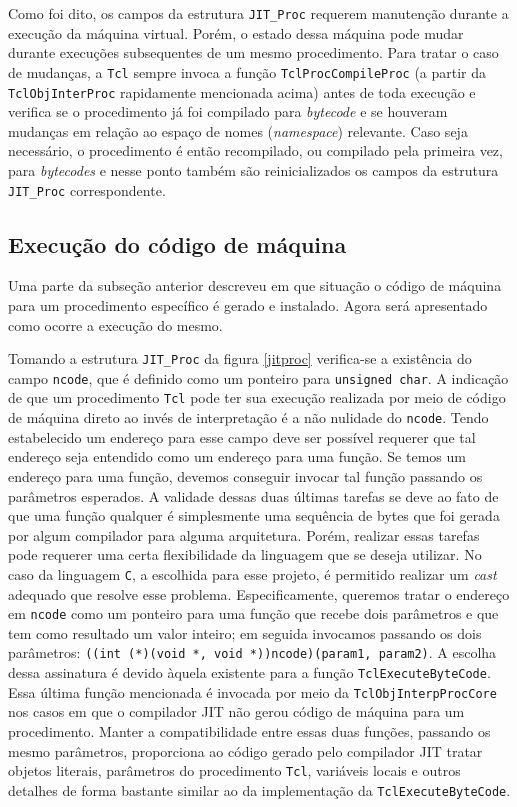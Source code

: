 Como foi dito, os campos da estrutura \verb!JIT_Proc! requerem
manutenção durante a execução da máquina virtual. Porém, o estado dessa
máquina pode mudar durante execuções subsequentes de um mesmo
procedimento. Para tratar o caso de mudanças, a \texttt{Tcl} sempre invoca a
função \verb!TclProcCompileProc! (a partir da \verb!TclObjInterProc!
rapidamente mencionada acima) antes de toda execução e verifica se o
procedimento já foi compilado para \textit{bytecode} e se houveram
mudanças em relação ao espaço de nomes (\textit{namespace})
relevante. Caso seja necessário, o procedimento é então recompilado,
ou compilado pela primeira vez, para \textit{bytecodes} e nesse ponto
também são reinicializados os campos da estrutura \verb!JIT_Proc!
correspondente.


\subsection{Execução do código de máquina}
\label{codeexec}
Uma parte da subseção anterior descreveu em que situação o código de
máquina para um procedimento específico é gerado e instalado. Agora será
apresentado como ocorre a execução do mesmo.

Tomando a estrutura \verb!JIT_Proc! da figura \ref{jitproc}
verifica-se a existência do campo \verb!ncode!, que é definido como
um ponteiro para \verb!unsigned char!. A indicação de que um
procedimento \texttt{Tcl} pode ter sua execução realizada por meio de
código de máquina direto ao invés de interpretação é a não nulidade do
\verb!ncode!. Tendo estabelecido um endereço para esse campo deve ser
possível requerer que tal endereço seja entendido como um endereço para
uma função. Se temos um endereço para uma função, devemos conseguir
invocar tal função passando os parâmetros esperados. A validade dessas
duas últimas tarefas se deve ao fato de que uma função qualquer é
simplesmente uma sequência de bytes que foi gerada por algum
compilador para alguma arquitetura. Porém, realizar essas tarefas pode
requerer uma certa flexibilidade da linguagem que se deseja
utilizar. No caso da linguagem \texttt{C}, a escolhida para
esse projeto, é permitido realizar um \textit{cast} adequado que
resolve esse problema. Especificamente, queremos tratar o endereço em
\verb!ncode! como um ponteiro para uma função que recebe dois
parâmetros e que tem como resultado um valor inteiro;
em seguida invocamos passando os dois parâmetros:
\verb!((int (*)(void *, void *))ncode)(param1, param2)!. A escolha
dessa assinatura é devido àquela existente para a função
\verb!TclExecuteByteCode!. Essa última função mencionada é invocada
por meio da \verb!TclObjInterpProcCore! nos casos em que o compilador
JIT não gerou código de máquina para um procedimento. Manter a
compatibilidade entre essas duas funções, passando os mesmo
parâmetros, proporciona ao código gerado pelo compilador JIT tratar
objetos literais, parâmetros do procedimento \texttt{Tcl}, variáveis
locais e outros detalhes de forma bastante similar ao da
implementação da \verb!TclExecuteByteCode!.


